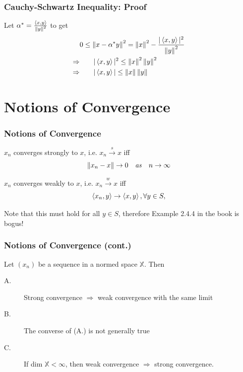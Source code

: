 \documentclass{beamer}
\begin{document}
\begin{frame}\frametitle{Cauchy-Schwartz Inequality: Proof}
Let $\alpha^*= \frac{\left< x,y \right>}{\left\| y\right\| ^2}$ to get
\begin{align*}
	& 0 \leq \left\| x - \alpha^*y\right\| ^2 = \left\| x\right\| ^2 - \frac{|\left< x,y \right>|^2}{\left\| y\right\| ^2} \\
	\Rightarrow &\qquad |\left< x,y \right> |^2 \leq \left\| x\right\| ^2\left\| y\right\| ^2 \\
	\Rightarrow &\qquad |\left< x,y \right> | \leq \left\| x\right\|  \left\| y\right\|
\end{align*}
\end{frame}

\section{Notions of Convergence}
\frame{\sectionpage}

\begin{frame}\frametitle{Notions of Convergence}

\begin{definition}
$x_n$ converges strongly to $x$, i.e. $x_n \overset{s}{\to} x$ iff
\[
\left\| x_n-x\right\|  \to 0 \quad \mathit{ as } \quad n \to \infty 
\]	
\end{definition}

\begin{definition}
$x_n$ converges weakly to $x$, i.e. $x_n \overset{w}{\to} x$ iff
\[ 
\left< x_n, y \right> \to \left< x,y \right>, \forall y \in S, 
\]	
\end{definition}

Note that this must hold for all $y \in S$, therefore Example 2.4.4 in the book is bogus!

\end{frame}

\begin{frame}\frametitle{Notions of Convergence (cont.)}
\begin{theorem}
  Let $(x_n)$ be a sequence in a normed space $\mathbb{X}$.  Then
\begin{description}
  \item[A.] Strong convergence $\Rightarrow$ weak convergence with the same limit
  \item[B.] The converse of (A.) is not generally true
  \item[C.] If dim $\mathbb{X} < \infty$, then weak convergence $\Rightarrow$ strong convergence.
\end{description}
\end{theorem}
	
\end{frame}
\end{document}
